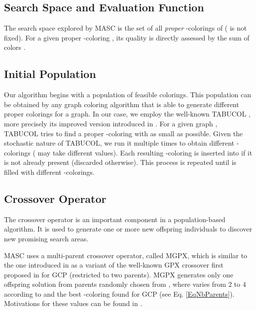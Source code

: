 \documentclass{elsart}
\begin{document}
\subsection{Search Space and Evaluation Function}
\label{Search Space}

The search space explored by MASC is the set  of all \textsl{proper} -colorings of  ( is not fixed). For a given proper -coloring , its quality is directly assessed by the sum of colors . 

\subsection{Initial Population}
\label{subsec_sol_initial_population}

Our algorithm begins with a population  of  feasible colorings. This population can be obtained by any graph coloring algorithm that is able to generate different proper colorings for a graph. In our case, we employ the well-known TABUCOL \cite{Hertz&DeWerra1987}, more precisely its improved version introduced in \cite{Galinier&Hao1999}. For a given graph , TABUCOL tries to find a proper -coloring with  as small as possible. Given the stochastic nature of TABUCOL, we run it multiple times to obtain different -colorings ( may take different values). Each resulting -coloring is inserted into  if it is not already present (discarded otherwise). This process is repeated until  is filled with  different -colorings.


\subsection{Crossover Operator}
\label{subsec_sol_crossover_operator}

The crossover operator is an important component in a population-based algorithm. It is used to generate one or more new offspring individuals to discover new promising search areas.

MASC uses a multi-parent crossover operator, called MGPX, which is similar to the one introduced in \cite{Hamiez&Hao2002} as a variant of the well-known GPX crossover first proposed in \cite{Galinier&Hao1999} for GCP (restricted to two parents). MGPX generates only one offspring solution  from  parents randomly chosen from , where  varies from 2 to 4 according to  and the best -coloring found for GCP (see Eq. \ref{EqNbParents}). Motivations for these  values can be found in \cite{Porumbel&al2010}.
\end{document}
